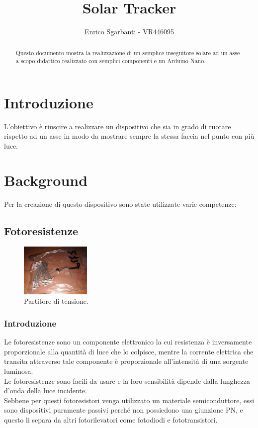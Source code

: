\documentclass[12pt,oneside,a4paper]{article}
\title{\textbf{Solar Tracker}}
\author{Enrico Sgarbanti - VR446095}
\begin{document}
\maketitle



\begin{abstract}
    Questo documento mostra la realizzazione di un semplice inseguitore solare ad un asse a scopo didattico realizzato con semplici componenti e un Arduino Nano.
\end{abstract}



\section{Introduzione}
L'obiettivo è riuscire a realizzare un dispositivo che sia in grado di ruotare rispetto ad un asse in modo da mostrare sempre la stessa faccia nel punto con più luce.



\section{Background}
Per la creazione di questo dispositivo sono state utilizzate varie competenze:


\subsection{Fotoresistenze}
\begin{figure}[ht!]
    \centering
    \includegraphics[width=0.3\textwidth]{figures/fotoresistenze.jpg}
    \caption{Partitore di tensione.}
\end{figure}


\subsubsection{Introduzione}
Le fotoresistenze\cite{Photoresistor1}\cite{Photoresistor2} sono un componente elettronico la cui resistenza è inversamente proporzionale alla quantità di luce che lo colpisce, mentre la corrente elettrica che transita attraverso tale componente è proporzionale all'intensità di una sorgente luminosa.
\\Le fotoresistenze sono facili da usare e la loro sensibilità dipende dalla lunghezza d'onda della luce incidente.
\\Sebbene per questi fotoresistori venga utilizzato un materiale semiconduttore, essi sono dispositivi puramente passivi perché non possiedono una giunzione PN, e questo li separa da altri fotorilevatori come fotodiodi e fototransistori.
\end{document}
